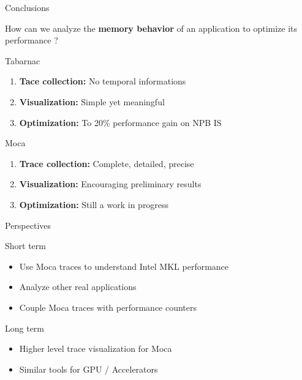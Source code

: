 \documentclass[xcolor={usenames,dvipsnames},hyperref={pdfusetitle}]{beamer}
\begin{document}
\begin{frame}{Conclusions}
    \begin{exampleblock}{}
        How can we analyze the \textbf{memory behavior} of an application to optimize its performance ?
    \end{exampleblock}
    \pause
    \begin{block}{Tabarnac~\cite{Beniamine15TABARNAC}}
        \begin{enumerate}
            \item \textbf{Tace collection:} No temporal informations
            \item \textbf{Visualization:} Simple yet meaningful
            \item \textbf{Optimization:} To 20\% performance gain on NPB IS
        \end{enumerate}           
    \end{block}
    \pause
    \begin{exampleblock}{Moca~\cite{Beniamine15Memory,Beniamine16Moca}}
        \begin{enumerate}
            \item \textbf{Trace collection:} Complete, detailed, precise
            \item \textbf{Visualization:} Encouraging preliminary results
            \item \textbf{Optimization:} Still a work in progress
        \end{enumerate}          
    \end{exampleblock}
\end{frame}

\begin{frame}{Perspectives}
    \begin{block}{Short term}
        \begin{itemize}
            \item Use Moca traces to understand Intel MKL performance
            \item Analyze other real applications
            \item Couple Moca traces with performance counters
        \end{itemize}
    \end{block}
    \pause
    \begin{block}{Long term}
        \begin{itemize}
            \item Higher level trace visualization for Moca
            \item Similar tools for GPU / Accelerators
        \end{itemize}
    \end{block}
\end{frame}
\end{document}
